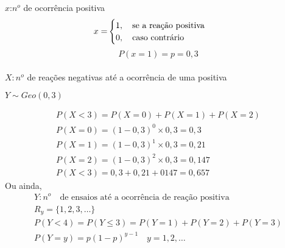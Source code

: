 \begin{description}
      $x$:$n^o$ de ocorrência positiva 
      \begin{align*}
        x=&\begin{cases}
          1, \text{\quad se a reação positiva}\\
          0, \text{\quad caso contrário}
        \end{cases}
      \end{align*}
      $$P(x=1)=p=0,3$$\\
      $X: n^o$ de reações negativas até a ocorrência de uma positiva\\
      \begin{center}$Y \sim Geo(0,3)$\end{center}
      \begin{align*}
        P(X<3)=P(X=0)+P(X=1)+P(X=2)\\
        P(X=0)=(1-0,3)^0 \times 0,3 = 0,3\\
        P(X=1)=(1-0,3)^1 \times 0,3 = 0,21\\
        P(X=2)=(1-0,3)^2 \times 0,3 = 0,147\\
        P(X<3)=0,3+0,21+0147=0,657
      \end{align*}
      Ou ainda,
      \begin{align*}
        Y: n^o \quad \text{de ensaios até a ocorrência de reação positiva}\\
        R_y = \{ 1,2,3,\ldots \}\\
        P( Y<4 ) = P (Y \leq 3) = P(Y=1)+ P(Y=2)+P(Y=3)\\
        P(Y=y)= p(1-p)^{y-1} \quad y=1,2,\dots
      \end{align*}
    \end{description}
